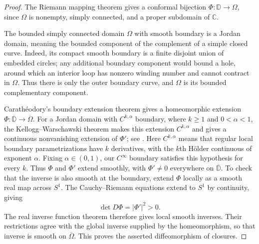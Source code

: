 \begin{proof}
The Riemann mapping theorem gives a conformal bijection
$\Phi:\mathbb D\to\Omega$, since $\Omega$ is nonempty, simply connected,
and a proper subdomain of $\mathbb C$.

The bounded simply connected domain $\Omega$ with smooth boundary is a
Jordan domain, meaning the bounded component of the complement of a
simple closed curve. Indeed, its compact smooth boundary is a finite disjoint
union of embedded circles; any additional boundary component would
bound a hole, around which an interior loop has nonzero winding number
and cannot contract in $\Omega$. Thus there is only the outer boundary
curve, and $\Omega$ is its bounded complementary component.

Carath\'eodory's boundary extension theorem gives a homeomorphic extension
$\Phi:\overline{\mathbb D}\to\overline\Omega$.
For a Jordan domain with $C^{k,\alpha}$ boundary, where $k\ge1$ and
$0<\alpha<1$, the Kellogg--Warschawski theorem makes this extension
$C^{k,\alpha}$ and gives a continuous nonvanishing extension of $\Phi'$;
see \cite[Chapter 2 and Theorems 3.5 and 3.6]{Pom92}.
Here $C^{k,\alpha}$ means that regular local boundary parametrizations
have $k$ derivatives, with the $k$th H\"older continuous of exponent
$\alpha$. Fixing $\alpha\in(0,1)$, our $C^\infty$ boundary satisfies
this hypothesis for every $k$. Thus $\Phi$ and $\Phi'$ extend smoothly,
with $\Phi'\ne0$ everywhere on $\overline{\mathbb D}$.
To check that the inverse is also smooth at the boundary, extend $\Phi$
locally as a smooth real map across $S^1$. The Cauchy--Riemann equations
extend to $S^1$ by continuity, giving
\[
 \det D\Phi=|\Phi'|^2>0.
\]
The real inverse function theorem therefore gives local smooth inverses.
Their restrictions agree with the global inverse supplied by the
homeomorphism, so that inverse is smooth on $\overline\Omega$.
This proves the asserted diffeomorphism of closures.
\end{proof}

